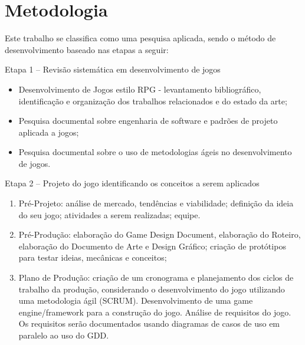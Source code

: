\documentclass[12pt, 
openright, 
oneside, 
a4paper,    
brazil]{facom-ufu-abntex2}
\begin{document}
\section{Metodologia}


Este trabalho se classifica como uma pesquisa aplicada, sendo o método de desenvolvimento baseado nas etapas a seguir:

Etapa 1 – Revisão sistemática em desenvolvimento de jogos
\begin{itemize}
\item Desenvolvimento de Jogos estilo RPG - levantamento bibliográfico, identificação e organização dos trabalhos relacionados e do estado da arte;
\item Pesquisa documental sobre engenharia de software e padrões de projeto aplicada a jogos;
\item Pesquisa documental sobre o uso de metodologias ágeis no desenvolvimento de jogos.
\end{itemize}

Etapa 2 – Projeto do jogo identificando os conceitos a serem aplicados 
\begin{enumerate}
\item Pré-Projeto: análise de mercado, tendências e viabilidade;
definição da ideia do seu jogo; atividades a serem realizadas;
equipe.
\item Pré-Produção: elaboração do Game Design Document, elaboração do Roteiro, elaboração do Documento de Arte e Design Gráfico; criação de protótipos para testar ideias, mecânicas e conceitos;
\item Plano de Produção: criação de um cronograma e planejamento dos ciclos de trabalho da produção, considerando o desenvolvimento do jogo utilizando uma  metodologia ágil (SCRUM). Desenvolvimento de uma game engine/framework para a construção do jogo. Análise de requisitos do jogo. Os requisitos serão documentados usando diagramas de casos de uso em paralelo ao uso do GDD.
\end{enumerate}
\end{document}
